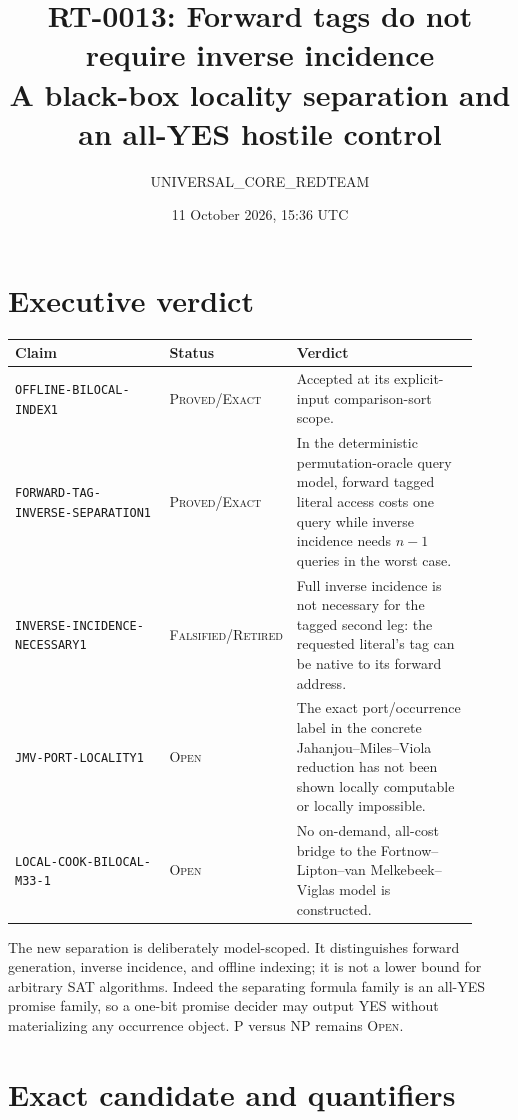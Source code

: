 \documentclass[11pt]{article}
\title{RT-0013: Forward tags do not require inverse incidence\\
\large A black-box locality separation and an all-YES hostile control}
\author{UNIVERSAL\_CORE\_REDTEAM}
\date{11 October 2026, 15:36 UTC}
\newcommand{\status}[1]{\textsc{#1}}
\begin{document}
\maketitle

\section*{Executive verdict}

\begin{center}
\small
\begin{tabular}{p{0.34\linewidth}p{0.18\linewidth}p{0.40\linewidth}}
\toprule
Claim & Status & Verdict \\
\midrule
\texttt{OFFLINE-BILOCAL-INDEX1} & \status{Proved/Exact} & Accepted at its explicit-input comparison-sort scope. \\
\texttt{FORWARD-TAG-INVERSE-SEPARATION1} & \status{Proved/Exact} & In the deterministic permutation-oracle query model, forward tagged literal access costs one query while inverse incidence needs $n-1$ queries in the worst case. \\
\texttt{INVERSE-INCIDENCE-NECESSARY1} & \status{Falsified/Retired} & Full inverse incidence is not necessary for the tagged second leg: the requested literal's tag can be native to its forward address. \\
\texttt{JMV-PORT-LOCALITY1} & \status{Open} & The exact port/occurrence label in the concrete Jahanjou--Miles--Viola reduction has not been shown locally computable or locally impossible. \\
\texttt{LOCAL-COOK-BILOCAL-M33-1} & \status{Open} & No on-demand, all-cost bridge to the Fortnow--Lipton--van Melkebeek--Viglas model is constructed. \\
\bottomrule
\end{tabular}
\end{center}

The new separation is deliberately model-scoped.  It distinguishes forward
generation, inverse incidence, and offline indexing; it is not a lower bound
for arbitrary SAT algorithms.  Indeed the separating formula family is an
all-YES promise family, so a one-bit promise decider may output YES without
materializing any occurrence object.  P versus NP remains \status{Open}.

\section{Exact candidate and quantifiers}
\end{document}
